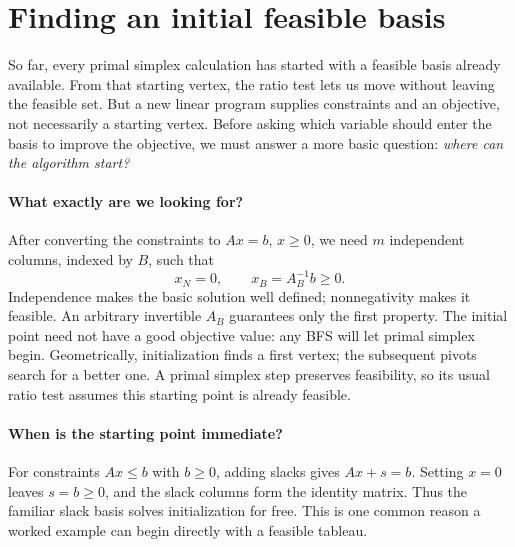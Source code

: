 \documentclass[11pt,a4paper]{article}
\begin{document}
\section{Finding an initial feasible basis}\label{sec:initialization}
So far, every primal simplex calculation has started with a feasible basis
already available. From that starting vertex, the ratio test lets us move
without leaving the feasible set. But a new linear program supplies constraints
and an objective, not necessarily a starting vertex. Before asking which
variable should enter the basis to improve the objective, we must answer a
more basic question: \emph{where can the algorithm start?}

\paragraph{What exactly are we looking for?}
After converting the constraints to $Ax=b$, $x\geq0$, we need $m$ independent
columns, indexed by $B$, such that
\[
  x_N=0,\qquad x_B=A_B^{-1}b\geq0.
\]
Independence makes the basic solution well defined; nonnegativity makes it
feasible. An arbitrary invertible $A_B$ guarantees only the first property.
The initial point need not have a good objective value: any BFS will let
primal simplex begin. Geometrically, initialization finds a first vertex;
the subsequent pivots search for a better one. A primal simplex step preserves
feasibility, so its usual ratio test assumes this starting point is already
feasible.

\paragraph{When is the starting point immediate?}
For constraints $Ax\leq b$ with $b\geq0$, adding slacks gives
$Ax+s=b$. Setting $x=0$ leaves $s=b\geq0$, and the slack columns form the
identity matrix. Thus the familiar slack basis solves initialization for free.
This is one common reason a worked example can begin directly with a feasible
tableau.
\end{document}
